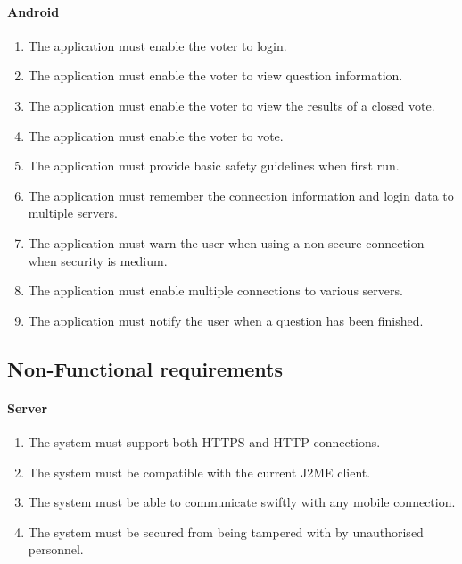 \documentclass[11pt,twoside,a4paper]{book}
\begin{document}
\paragraph*{Android}
\begin{enumerate}
\item The application must enable the voter to login. 
\item The application must enable the voter to view question information.
\item The application must enable the voter to view the results of a closed vote. 
\item The application must enable the voter to vote.
\item The application must provide basic safety guidelines when first run.
\item The application must remember the connection information and login data to multiple servers.
\item The application must warn the user when using a non-secure connection when security is medium.
\item The application must enable multiple connections to various servers.
\item The application must notify the user when a question has been finished.
\end{enumerate}
\subsection{Non-Functional requirements}
\paragraph*{Server}
\begin{enumerate}
\item  The system must support both HTTPS and HTTP connections.
\item The system must be compatible with the current J2ME client.
\item The system must be able to communicate swiftly with any mobile connection.
\item The system must be secured from being tampered with by unauthorised personnel.
\end{enumerate}
\end{document}
